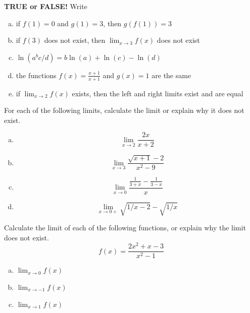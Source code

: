 \documentclass[11pt]{exam}
\theoremstyle{definition}
\begin{document}
\begin{questions}

\addpoints

\question[10]\mbox{}
\textbf{TRUE or FALSE!}  Write 
\begin{enumerate}[(a)]
\item if $f(1) = 0$ and $g(1)=3$, then $g(f(1)) = 3$
\vspace{1.2in}
\item if $f(3)$ does not exist, then $\lim_{x\rightarrow 3} f(x)$ does not exist
\vspace{1.2in}
\item $\ln(a^bc/d) = b\ln(a)+\ln(c)-\ln(d)$
\vspace{1.2in}
\item the functions $f(x) = \frac{x+1}{x+1}$ and $g(x) = 1$ are the same
\vspace{1.2in}
\item if $\lim_{x\rightarrow 2}f(x)$ exists, then the left and right limits exist and are equal
\vspace{1.2in}
\end{enumerate}

\newpage
\question[12]\mbox{}
For each of the following limits, calculate the limit or explain why it does not exist.
\begin{enumerate}[(a)]
\item $$\lim_{x\rightarrow 2} \frac{2x}{x+2}$$
\vspace{1.5in}
\item $$\lim_{x\rightarrow 3} \frac{\sqrt{x+1}-2}{x^2-9}$$
\vspace{1.5in}
\item $$\lim_{x\rightarrow 0} \frac{\frac{1}{3+x}-\frac{1}{3-x}}{x}$$
\vspace{1.5in}
\item $$\lim_{x\rightarrow 0+}\sqrt{1/x-2}-\sqrt{1/x}$$
\end{enumerate}

\newpage
\question[10]\mbox{}
Calculate the limit of each of the following functions, or explain why the limit does not exist.
$$f(x) = \frac{2x^2+x-3}{x^2-1}$$
\begin{enumerate}[(a)]
\item $\lim_{x\rightarrow 0}f(x)$
\vspace{2in}
\item $\lim_{x\rightarrow -1} f(x)$
\vspace{2in}
\item $\lim_{x\rightarrow  1} f(x)$
\end{enumerate}


\end{questions}
\end{document}
